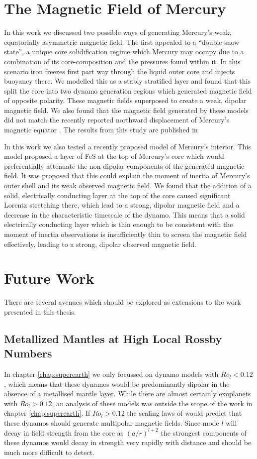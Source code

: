 \section{The Magnetic Field of Mercury}
In this work we discussed two possible ways of generating Mercury's weak, equatorially asymmetric magnetic field. The first appealed to a ``double snow state'', a unique core solidification regime which Mercury may occupy due to a combination of its core-composition and the pressures found within it. In this scenario iron freezes first part way through the liquid outer core and injects buoyancy there. We modelled this as a stably stratified layer and found that this split the core into two dynamo generation regions which generated magnetic field of opposite polarity. These magnetic fields superposed to create a weak, dipolar magnetic field. We also found that the magnetic field generated by these models did not match the recently reported northward displacement of Mercury's magnetic equator \citep{smith2012}. The results from this study are published in \citet{vilim2010}

In this work we also tested a recently proposed model of Mercury's interior. This model proposed a layer of FeS at the top of Mercury's core which would preferentially attenuate the non-dipolar components of the generated magnetic field. It was proposed that this could explain the moment of inertia of Mercury's outer shell and its weak observed magnetic field. We found that the addition of a solid, electrically conducting layer at the top of the core caused significant Lorentz stretching there, which lead to a strong, dipolar magnetic field and a decrease in the characteristic timescale of the dynamo. This means that a solid electrically conducting layer which is thin enough to be consistent with the moment of inertia observations is insufficiently thin to screen the magnetic field effectively, leading to a strong, dipolar observed magnetic field.


\section{Future Work}
There are several avenues which should be explored as extensions to the work presented in this thesis.

\subsection{Metallized Mantles at High Local Rossby Numbers}
In chapter \ref{chap:superearth} we only focussed on dynamo models with $Ro_l<0.12$, which means that these dynamos would be predominantly dipolar in the absence of a metallised mantle layer. While there are almost certainly exoplanets with $Ro_l>0.12$, an analysis of these models was outside the scope of the work in chapter \ref{chap:superearth}. If $Ro_l>0.12$ the scaling laws of \citet{christensen06scaling} would predict that these dynamos should generate multipolar magnetic fields. Since mode $l$ will decay in field strength from the core as $\left(a/r\right)^{l+2}$ the strongest components of these dynamos would decay in strength very rapidly with distance and should be much more difficult to detect. 

